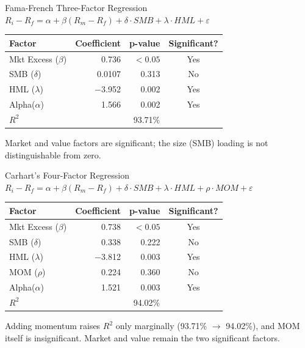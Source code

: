 \documentclass[11pt, aspectratio=43]{beamer}
\begin{document}
\begin{frame}{Fama-French Three-Factor Regression}
\centering
\small
$R_i - R_f = \alpha + \beta(R_m - R_f) + \delta \cdot SMB + \lambda \cdot HML + \varepsilon$

\vspace{0.5em}

\begin{tabular}{l r r c}
\toprule
\textbf{Factor} & \textbf{Coefficient} & \textbf{p-value} & \textbf{Significant?} \\
\midrule
Mkt Excess ($\beta$) & 0.736 & $<0.05$ & Yes \\
SMB ($\delta$) & 0.0107 & 0.313 & No \\
HML ($\lambda$) & $-$3.952 & 0.002 & Yes \\
Alpha($\alpha$) & 1.566 & 0.002 & Yes\\
\midrule
$R^2$ & \multicolumn{3}{c}{93.71\%} \\

\bottomrule
\end{tabular}

\vspace{0.5em}
\footnotesize
Market and value factors are significant; the size (SMB) loading is not distinguishable from zero. 
\end{frame}

\begin{frame}{Carhart's Four-Factor Regression}
\centering
\small
$R_i - R_f = \alpha + \beta(R_m - R_f) + \delta \cdot SMB + \lambda \cdot HML + \rho \cdot MOM + \varepsilon$

\vspace{0.5em}

\begin{tabular}{l r r c}
\toprule
\textbf{Factor} & \textbf{Coefficient} & \textbf{p-value} & \textbf{Significant?} \\
\midrule
Mkt Excess ($\beta$) & 0.738 & $<0.05$ & Yes \\
SMB ($\delta$) & 0.338 & 0.222 & No \\
HML ($\lambda$) & $-$3.812 & 0.003 & Yes \\
MOM ($\rho$) & 0.224 & 0.360 & No \\
Alpha($\alpha$) & 1.521 & 0.003 & Yes\\
\midrule
$R^2$ & \multicolumn{3}{c}{94.02\%} \\
\bottomrule
\end{tabular}

\vspace{0.5em}
\footnotesize
Adding momentum raises $R^2$ only marginally (93.71\% $\to$ 94.02\%), and MOM itself is insignificant. Market and value remain the two significant factors. 
\end{frame}
\end{document}

